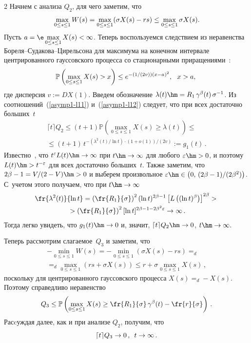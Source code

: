 \begin{multicols}{2}
 Начнем с анализа $Q_2$, для чего заметим, что
\begin{equation}
\hspace*{-1mm}\max\limits_{0 \leq s \leq 1}W(s)=\max\limits_{0 \leq s \leq 1}(\sigma X(s)-rs)
\leq \max\limits_{0 \leq s \leq 1}\sigma X(s). \!\!
\label{asymp1-l11}
\end{equation}
Пусть $a=\e \max\limits_{0 \leq s \leq 1}X(s)<\infty$. Теперь
воспользуемся следствием из неравенства  Бо\-ре\-ля--Су\-да\-ко\-ва--Ци\-рель\-со\-на
для максимума на конечном интервале  центрированного гауссовского процесса со
стационарными приращениями~\cite{Adler}:
\begin{equation}
\hspace*{-1.5mm}\mathbb{P} \left( \max\limits_{0 \leq s \leq 1} X(s)> x \right) \leq
e^{-(1/(2v))(x-a)^2}, \ \ x>a,\!
\label{asymp1-l12}
\end{equation}
где дисперсия $v:=D X(1)$. Введем обозначение
$\lambda(t)\hm=R_1\,\gamma^\beta(t)\,\sigma^{-1}$. Из соотношений~(\ref{asymp1-l11})
и~(\ref{asymp1-l12}) следует, что при всех
достаточно больших~$t$
\begin{multline*}
\lceil t \rceil Q_2 \le  (t+1)\mathbb{P} \left( \max_{0 \leq s \leq 1}
X(s) \geq \lambda(t) \right)\leq{}\\
{}\leq (t+1)\,t^{-({\lambda^2(t)}/{\ln
t})\cdot (1+o(1))/(2v)} :=g_1(t)\,.
\end{multline*}
Известно~\cite{Seneta}, что   $t^\varepsilon L(t)\hm\to \infty $ при
$t\hm\to \infty$ для любого $\varepsilon\hm>0$, и поэтому
$L(t)\hm>t^{-\varepsilon}$ для всех  достаточно больших~$t$. Также
заметим, что $2\beta-1={V}/(2-V)\hm>0$ и выберем произвольное
$\varepsilon\hm\in \left(0,\,(2\beta-1)/(2\beta^2)\right)$. С~учетом этого
получаем, что при $t\hm\to \infty$
\begin{multline*}
\fr{\lambda^2(t)}{\ln t}=\left( \fr{R_1}{\sigma} \right)^2(\ln t)^{2\beta-1}
\left[L\left((\ln t)^\beta\right)\right] ^{2\beta}>{}\\
{}> \left( \fr{R_1}{\sigma} \right)^2 [\ln t]^{2\beta-1-2\beta^2
\varepsilon}\to \infty\,.
\end{multline*}
Тогда легко увидеть, что  $g_1(t) \hm\to  0$ и, значит, $ \lceil t
\rceil Q_2 \hm\to 0$, $t \hm\to \infty.$

 Теперь рассмотрим слагаемое~$Q_3$ и заметим, что
\begin{multline*}
-\min\limits_{0 \leq s \leq 1} W(s)=-\min\limits_{0 \leq s \leq 1} (\sigma
X(s)-rs)=_d{}\\
{}=_d\max\limits_{0 \leq s \leq 1} (rs+\sigma X(s))\leq
r+\sigma \max\limits_{0 \leq s \leq 1} X(s)\,,
\end{multline*}
поскольку для  центрированного гауссовского процесса $X(s)=_d -X(s)$.
Поэтому справедливо неравенство
$$
Q_3 \leq \mathbb{P} \left(\max\limits_{0 \leq s \leq 1}X(s) \geq
\fr{R_1}{\sigma}\, \gamma^\beta(t) - \fr{r}{\sigma}\right)\,.
$$
Расcуждая далее, как и при анализе $Q_2$, получим, что
$$
\lceil t \rceil Q_3 \to 0\,,\enskip t \to \infty\,.
$$


\end{multicols}
